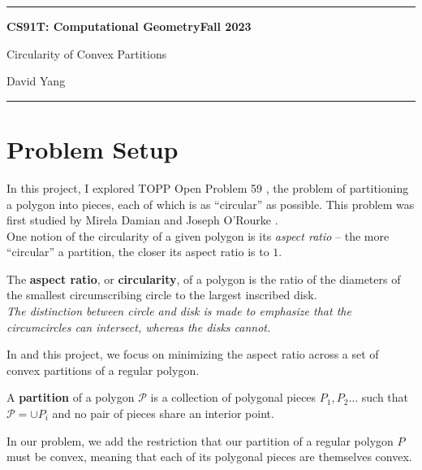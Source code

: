 \documentclass[11pt]{article}
\begin{document}
\hrule
\begin{center}
    \textbf{CS91T: Computational Geometry}\hfill \textbf{Fall 2023}\newline

    {\Large Circularity of Convex Partitions}

    David Yang
\end{center}

\hrule

\vspace{1em}

\section{Problem Setup}
In this project, I explored TOPP Open Problem 59 \cite{topp}, the problem of partitioning a polygon into pieces, each of which is as
``circular'' as possible. This problem was first studied by Mirela Damian and Joseph O'Rourke \cite{damian_rourke}. \\


One notion of the circularity of a given polygon is its \textit{aspect ratio} -- the more ``circular'' a partition, the closer its aspect ratio is to $1$.

\begin{definition}
The \textbf{aspect ratio}, or \textbf{circularity}, of a polygon is the ratio of the diameters of the smallest circumscribing circle to the largest inscribed disk. \\

\textit{The distinction between circle and disk is made to emphasize that the circumcircles can intersect, whereas the disks cannot.}
\end{definition}

In \cite{topp} and this project, we focus on minimizing the aspect ratio across a set of convex partitions of a regular polygon.

\begin{definition}[Partition]
A \textbf{partition} of a polygon $\mathcal{P}$ is a collection of polygonal pieces $P_1, P_2 \dots $ such that $\mathcal{P} = \cup P_i$ and no pair of pieces share an interior point. 
\end{definition}

In our problem, we add the restriction that our partition of a regular polygon $P$ must be convex, meaning that each of its polygonal pieces are themselves convex. \\
\end{document}

